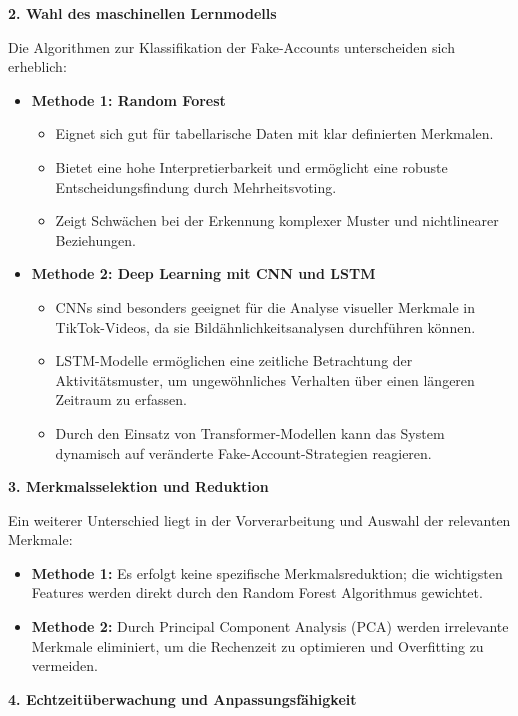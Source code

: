\documentclass[12pt]{report}
\begin{document}
\textbf{2. Wahl des maschinellen Lernmodells}

Die Algorithmen zur Klassifikation der Fake-Accounts unterscheiden sich erheblich:

\begin{itemize}
	\item \textbf{Methode 1: Random Forest}
	\begin{itemize}
		\item Eignet sich gut für tabellarische Daten mit klar definierten Merkmalen.
		\item Bietet eine hohe Interpretierbarkeit und ermöglicht eine robuste Entscheidungsfindung durch Mehrheitsvoting.
		\item Zeigt Schwächen bei der Erkennung komplexer Muster und nichtlinearer Beziehungen.
	\end{itemize}
	
	\item \textbf{Methode 2: Deep Learning mit CNN und LSTM}
	\begin{itemize}
		\item CNNs sind besonders geeignet für die Analyse visueller Merkmale in TikTok-Videos, da sie Bildähnlichkeitsanalysen durchführen können.
		\item LSTM-Modelle ermöglichen eine zeitliche Betrachtung der Aktivitätsmuster, um ungewöhnliches Verhalten über einen längeren Zeitraum zu erfassen.
		\item Durch den Einsatz von Transformer-Modellen kann das System dynamisch auf veränderte Fake-Account-Strategien reagieren.
	\end{itemize}
\end{itemize}

\textbf{3. Merkmalsselektion und Reduktion}

Ein weiterer Unterschied liegt in der Vorverarbeitung und Auswahl der relevanten Merkmale:

\begin{itemize}
	\item \textbf{Methode 1:} Es erfolgt keine spezifische Merkmalsreduktion; die wichtigsten Features werden direkt durch den Random Forest Algorithmus gewichtet.
	\item \textbf{Methode 2:} Durch Principal Component Analysis (PCA) werden irrelevante Merkmale eliminiert, um die Rechenzeit zu optimieren und Overfitting zu vermeiden.
\end{itemize}

\textbf{4. Echtzeitüberwachung und Anpassungsfähigkeit}
\end{document}

